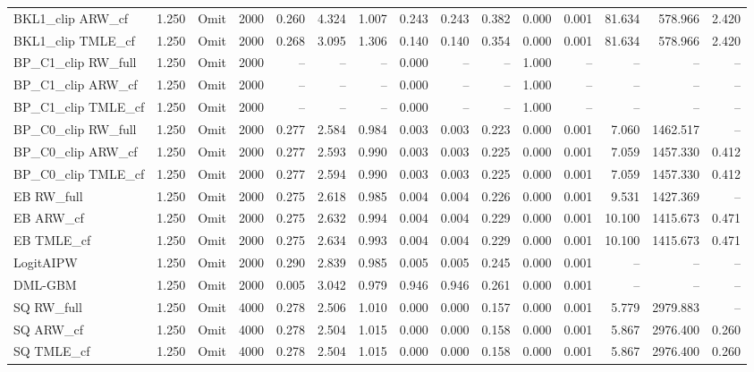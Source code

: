 \begin{tabular}{llllrrrrrrrrrrr}
BKL1\_clip ARW\_cf & 1.250 & Omit & 2000 & 0.260 & 4.324 & 1.007 & 0.243 & 0.243 & 0.382 & 0.000 & 0.001 & 81.634 & 578.966 & 2.420 \\
BKL1\_clip TMLE\_cf & 1.250 & Omit & 2000 & 0.268 & 3.095 & 1.306 & 0.140 & 0.140 & 0.354 & 0.000 & 0.001 & 81.634 & 578.966 & 2.420 \\
BP\_C1\_clip RW\_full & 1.250 & Omit & 2000 & -- & -- & -- & 0.000 & -- & -- & 1.000 & -- & -- & -- & -- \\
BP\_C1\_clip ARW\_cf & 1.250 & Omit & 2000 & -- & -- & -- & 0.000 & -- & -- & 1.000 & -- & -- & -- & -- \\
BP\_C1\_clip TMLE\_cf & 1.250 & Omit & 2000 & -- & -- & -- & 0.000 & -- & -- & 1.000 & -- & -- & -- & -- \\
BP\_C0\_clip RW\_full & 1.250 & Omit & 2000 & 0.277 & 2.584 & 0.984 & 0.003 & 0.003 & 0.223 & 0.000 & 0.001 & 7.060 & 1462.517 & -- \\
BP\_C0\_clip ARW\_cf & 1.250 & Omit & 2000 & 0.277 & 2.593 & 0.990 & 0.003 & 0.003 & 0.225 & 0.000 & 0.001 & 7.059 & 1457.330 & 0.412 \\
BP\_C0\_clip TMLE\_cf & 1.250 & Omit & 2000 & 0.277 & 2.594 & 0.990 & 0.003 & 0.003 & 0.225 & 0.000 & 0.001 & 7.059 & 1457.330 & 0.412 \\
EB RW\_full & 1.250 & Omit & 2000 & 0.275 & 2.618 & 0.985 & 0.004 & 0.004 & 0.226 & 0.000 & 0.001 & 9.531 & 1427.369 & -- \\
EB ARW\_cf & 1.250 & Omit & 2000 & 0.275 & 2.632 & 0.994 & 0.004 & 0.004 & 0.229 & 0.000 & 0.001 & 10.100 & 1415.673 & 0.471 \\
EB TMLE\_cf & 1.250 & Omit & 2000 & 0.275 & 2.634 & 0.993 & 0.004 & 0.004 & 0.229 & 0.000 & 0.001 & 10.100 & 1415.673 & 0.471 \\
LogitAIPW & 1.250 & Omit & 2000 & 0.290 & 2.839 & 0.985 & 0.005 & 0.005 & 0.245 & 0.000 & 0.001 & -- & -- & -- \\
DML-GBM & 1.250 & Omit & 2000 & 0.005 & 3.042 & 0.979 & 0.946 & 0.946 & 0.261 & 0.000 & 0.001 & -- & -- & -- \\
SQ RW\_full & 1.250 & Omit & 4000 & 0.278 & 2.506 & 1.010 & 0.000 & 0.000 & 0.157 & 0.000 & 0.001 & 5.779 & 2979.883 & -- \\
SQ ARW\_cf & 1.250 & Omit & 4000 & 0.278 & 2.504 & 1.015 & 0.000 & 0.000 & 0.158 & 0.000 & 0.001 & 5.867 & 2976.400 & 0.260 \\
SQ TMLE\_cf & 1.250 & Omit & 4000 & 0.278 & 2.504 & 1.015 & 0.000 & 0.000 & 0.158 & 0.000 & 0.001 & 5.867 & 2976.400 & 0.260 \\

\end{tabular}
